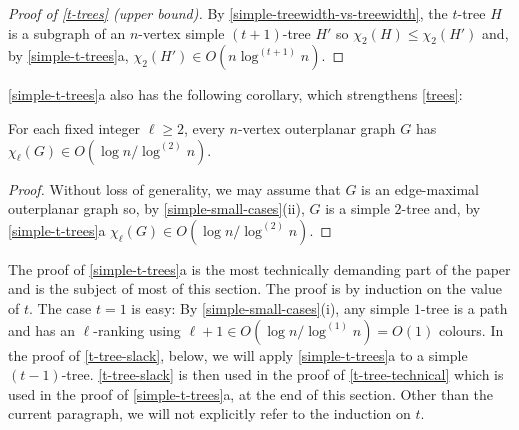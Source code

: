 \documentclass[kpfonts]{patmorin}
\newcommand{\trn}{\chi_2}
\newcommand{\lrn}{\chi_{\ell}}
\theoremstyle{named}
\newcommand{\weirdref}[2]{\cref{#1}#2}
\begin{document}
\begin{proof}[Proof of \cref{t-trees} (upper bound)]
    By \cref{simple-treewidth-vs-treewidth}, the $t$-tree $H$ is a subgraph of an $n$-vertex simple $(t+1)$-tree $H'$ so $\trn(H)\le \trn(H')$ and, by   \weirdref{simple-t-trees}{a}, $\trn(H')\in O(n\log^{(t+1)}n)$.
\end{proof}

\weirdref{simple-t-trees}{a} also has the following corollary, which strengthens \cref{trees}:

\begin{cor}\label{outerplanar}
    For each fixed integer $\ell\ge 2$, every $n$-vertex outerplanar graph $G$ has $\lrn(G)\in O(\log n/\log^{(2)} n)$.
\end{cor}

\begin{proof}
    Without loss of generality, we may assume that $G$ is an edge-maximal outerplanar graph so, by \cref{simple-small-cases}{(ii)}, $G$ is a simple $2$-tree and, by \weirdref{simple-t-trees}{a} $\lrn(G)\in O(\log n/\log^{(2)} n)$.
\end{proof}

The proof of \weirdref{simple-t-trees}{a} is the most technically demanding part of the paper and is the subject of most of this section.  The proof is by induction on the value of $t$. The case $t=1$ is easy: By \cref{simple-small-cases}(i), any simple $1$-tree is a path and has an $\ell$-ranking using $\ell+1\in O(\log n/\log^{(1)} n) = O(1)$ colours.  In the proof of \cref{t-tree-slack}, below, we will apply \weirdref{simple-t-trees}{a} to a simple $(t-1)$-tree. \cref{t-tree-slack} is then used in the proof of \cref{t-tree-technical} which is used in the proof of \weirdref{simple-t-trees}{a}, at the end of this section.  Other than the current paragraph, we will not explicitly refer to the induction on $t$.\label{induction-note}
\end{document}
